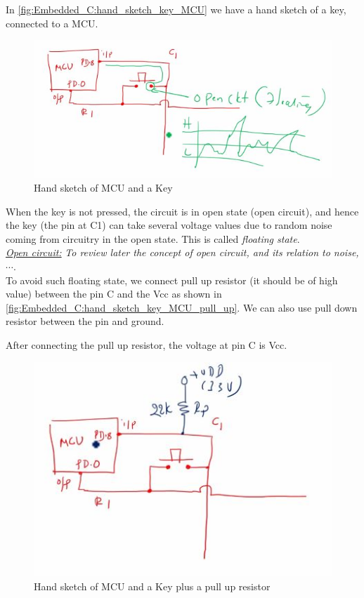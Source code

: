 In \autoref{fig:Embedded_C:hand_sketch_key_MCU} we have a hand sketch of a key, connected to a MCU.\\

\begin{figure}[h]
\centering
\includegraphics[scale=0.55]{Figures/Embedded_C/hand_sketch_key_MCU}
\caption{Hand sketch of MCU and a Key}
\label{fig:Embedded_C:hand_sketch_key_MCU}
\end{figure}


When the key is not pressed, the circuit is in open state (open circuit), and hence the key (the pin at C1) can take several voltage values due to random noise coming from circuitry in the open state. This is called \textit{floating state}.\\

 \underline{\textit{Open circuit:}} \textit{To review later the concept of open circuit, and its relation to noise,$\cdots$}.\\

To avoid such floating state, we connect pull up resistor (it should be of high value) between the pin C and the Vcc as shown in \autoref{fig:Embedded_C:hand_sketch_key_MCU_pull_up}. We can also use pull down resistor between the pin and ground. 

After connecting the pull up resistor, the voltage at pin C is Vcc.\\

\begin{figure}[h]
\centering
\includegraphics[scale=0.55]{Figures/Embedded_C/hand_sketch_key_MCU_pull_up}
\caption{Hand sketch of MCU and a Key plus a pull up resistor}
\label{fig:Embedded_C:hand_sketch_key_MCU_pull_up}
\end{figure}

